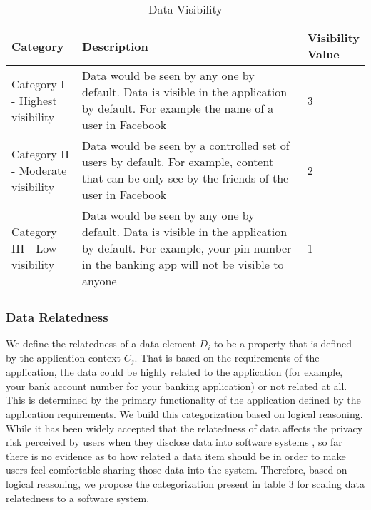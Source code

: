 \documentclass[10pt]{article}
\begin{document}
\begin{center}
\begin{table}[htbp]
\caption{Data Visibility}
\begin{center}
\begin{adjustbox}{width=0.5\textwidth} 
\begin{tabular}{|p{0.2\linewidth}|p{0.7\linewidth}|p{0.1\linewidth}|} 
\hline
Category & Description & Visibility Value \\
\hline
Category I - Highest visibility & Data would be seen by any one by default. Data is visible in the application by default. For example the name of a user in Facebook & 3 \\
\hline
Category II - Moderate visibility & Data would be seen by a controlled set of users by default. For example, content that can be only see by the friends of the user in Facebook & 2 \\
\hline
Category III - Low visibility & Data would be seen by any one by default. Data is visible in the application by default. For example, your pin number in the banking app will not be visible to anyone & 1 \\
\hline
\end{tabular}
\end{adjustbox}
\end{center}
\end{table}
\end{center} 

\subsubsection{Data Relatedness} 

We define the relatedness of a data element \textit {$D_i$} to be a property that is defined by the application context \textit {$C_j$}. That is based on the requirements of the application, the data could be highly related to the application (for example, your bank account number for your banking application) or not related at all. This is determined by the primary functionality of the application defined by the application requirements. We build this categorization based on logical reasoning. While it has been widely accepted that the relatedness of data affects the privacy risk perceived by users when they disclose data into software systems  \cite {nissenbaum2009privacy, john2010strangers}, so far there is no evidence as to how related a data item should be in order to make users feel comfortable sharing those data into the system. Therefore, based on logical reasoning, we propose the categorization present in table 3 for scaling data relatedness to a software system. 
\end{document}
